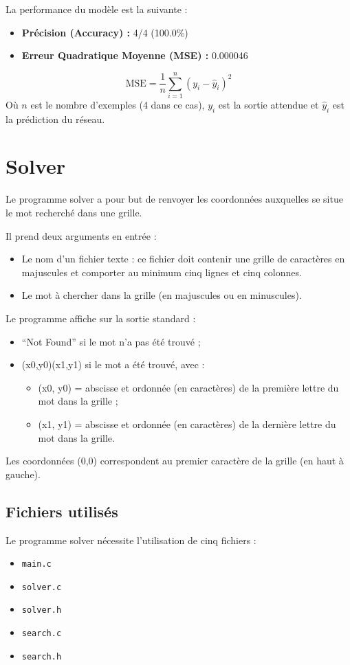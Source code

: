 \documentclass{article}
\begin{document}
La performance du modèle est la suivante :
\begin{itemize}
    \item \textbf{Précision (Accuracy) :} 4/4 (100.0\%)
    \item \textbf{Erreur Quadratique Moyenne (MSE) :} 0.000046
\end{itemize}
\[
\text{MSE} = \frac{1}{n} \sum_{i=1}^{n} (y_i - \hat{y}_i)^2
\]
Où \(n\) est le nombre d'exemples (4 dans ce cas), \(y_i\) est la sortie attendue et \(\hat{y}_i\) est la prédiction du réseau.

\section{Solver}
Le programme solver a pour but de renvoyer les coordonnées auxquelles se situe le mot recherché dans une grille.

Il prend deux arguments en entrée :
\begin{itemize}
    \item Le nom d’un fichier texte : ce fichier doit contenir une grille de caractères en majuscules et comporter au minimum cinq lignes et cinq colonnes.
    \item Le mot à chercher dans la grille (en majuscules ou en minuscules).
\end{itemize}

Le programme affiche sur la sortie standard :
\begin{itemize}
    \item ``Not Found'' si le mot n’a pas été trouvé ;
    \item (x0,y0)(x1,y1) si le mot a été trouvé, avec :
    \begin{itemize}
        \item (x0, y0) = abscisse et ordonnée (en caractères) de la première lettre du mot dans la grille ;
        \item (x1, y1) = abscisse et ordonnée (en caractères) de la dernière lettre du mot dans la grille.
    \end{itemize}
\end{itemize}

Les coordonnées (0,0) correspondent au premier caractère de la grille (en haut à gauche).

\subsection{Fichiers utilisés}

Le programme solver nécessite l’utilisation de cinq fichiers :
\begin{itemize}
    \item \texttt{main.c}
    \item \texttt{solver.c}
    \item \texttt{solver.h}
    \item \texttt{search.c}
    \item \texttt{search.h}
\end{itemize}
\end{document}
